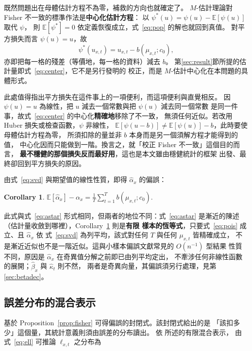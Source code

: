 \documentclass[UTF8, fontset=macnew, a4paper, 12pt]{ctexart}
\newtheorem{cor}{Corollary}
\newcommand{\Ex}{\mathbb{E}}
\begin{document}
既然問題出在母體估計方程不為零，補救的方向也就確定了。
$M$-估計理論對 Fisher 不一致的標準作法是\textbf{中心化估計方程}：
以 $\psi^{*}(u)=\psi(u)-\Ex[\psi(u)]$ 取代 $\psi$，
則 $\Ex[\psi^{*}]=0$ 依定義恢復成立，式~\eqref{eq:pop} 的解也就回到真值。
對平方損失而言 $\psi(u)=u$，故
\begin{equation}\label{eq:center}
\psi^{*}(u_{x,t})=u_{x,t}-b(\mu_{x,t};c_0),
\end{equation}
亦即把每一格的殘差（等價地，每一格的資料）減去 $b$。
第\ref{sec:result}節所提的估計量即式~\eqref{eq:center}，它不是另行發明的
校正，而是 $M$-估計中心化在本問題的具體形式。

此處值得指出平方損失在這件事上的一項便利，而這項便利與直覺相反。
因 $\psi(u)=u$ 為線性，把 $u$ 減去一個常數與把 $\psi(u)$ 減去同一個常數
是同一件事，故式~\eqref{eq:center} 的中心化\textbf{精確地}移除了不一致，
無須任何近似。若改用 Huber 損失或檢查函數，$\psi$ 非線性，
$\Ex[\psi(u-b)]\ne\Ex[\psi(u)]-b$，此時要使母體估計方程為零，
所須扣除的量並非 $b$ 本身而是另一個須解方程才能得到的值，
中心化因而只能做到一階。換言之，就「校正 Fisher 不一致」這個目的而言，
\textbf{最不穩健的那個損失反而最好用}，這也是本文雖由穩健統計的框架
出發、最終卻回到平方損失的原因。

由式~\eqref{eq:svd} 與期望值的線性性質，即得 $\hat\alpha_x$ 的偏誤：

\begin{cor}\label{cor:alpha}
$\displaystyle \Ex[\hat\alpha_x]-\alpha_x=\frac{1}{T}\sum_{t=1}^{T} b(\mu_{x,t};c_0).$
\end{cor}

此式與式~\eqref{eq:astar} 形式相同，但兩者的地位不同：式~\eqref{eq:astar}
是漸近的陳述（估計量收斂到哪裡），Corollary~\ref{cor:alpha} 則是\textbf{有限
樣本的恆等式}，只要式~\eqref{eq:pois} 成立、且 $\hat\alpha_x$ 依
式~\eqref{eq:svd} 為列平均，該式對任何 $T$ 與任何 $\mu_{x,t}$ 皆精確成立，
不是漸近近似也不是一階近似。這與小樣本偏誤文獻常見的 $O(n^{-1})$ 型結果
性質不同，原因是 $\hat\alpha_x$ 在奇異值分解之前即已由列平均定出，
不牽涉任何非線性函數的展開；$\hat\beta_x$ 與 $\hat\kappa_t$ 則不然，
兩者是奇異向量，其偏誤須另行處理，見第\ref{sec:betadec}。

\subsection{誤差分布的混合表示}

基於 Proposition~\ref{prop:fisher} 可得偏誤的封閉式。該封閉式給出的是
「該扣多少」這個量，其統計意義則須由誤差的分布讀出。
依 \citet[第 1 章]{mclachlan2000}所述的有限混合表示，
由式~\eqref{eq:ell} 可推論 $\ell_{x,t}$ 之分布為
\end{document}
